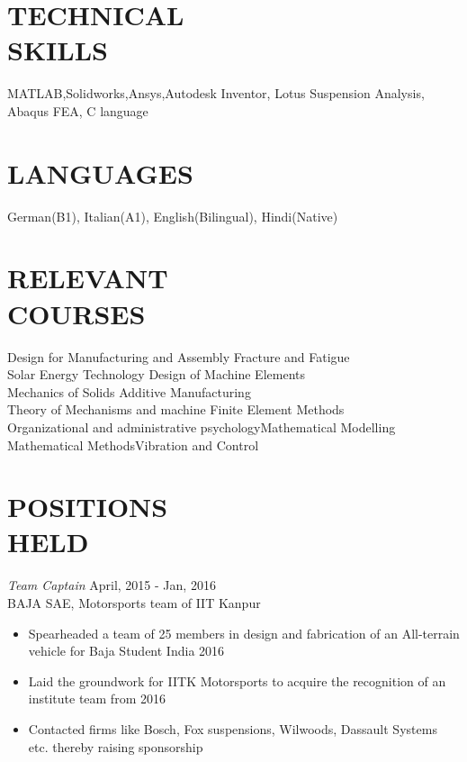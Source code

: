 \documentclass[margin, 10pt]{res} %
\begin{document}
\begin{resume}
\section{TECHNICAL \\ SKILLS} 

MATLAB,Solidworks,Ansys,Autodesk Inventor, Lotus Suspension Analysis, Abaqus FEA, C language\\

\section{LANGUAGES} 

German(B1), Italian(A1), English(Bilingual), Hindi(Native)\\
\section{RELEVANT \\ COURSES}
Design for Manufacturing and Assembly \hfill Fracture and Fatigue            \\
Solar Energy Technology \hfill Design of Machine Elements\\
Mechanics of Solids \hfill Additive Manufacturing\\
Theory of Mechanisms and machine \hfill Finite Element Methods\\
Organizational and administrative psychology\hfill Mathematical Modelling\\
Mathematical Methods\hfill Vibration and Control



 






\section{ POSITIONS \\HELD}

{\sl Team Captain} \hfill April, 2015 - Jan, 2016\\
BAJA SAE, Motorsports team of IIT Kanpur\\ 
\begin{itemize} \itemsep -2pt

\item Spearheaded a team of 25 members in design and fabrication of an All-terrain vehicle for Baja Student India 2016
\item Laid the groundwork for IITK Motorsports to acquire the recognition of an institute team from  2016
\item Contacted firms like Bosch, Fox suspensions, Wilwoods, Dassault Systems etc. thereby  raising sponsorship

\end{itemize}

\clearpage

\end{resume}
\end{document}
